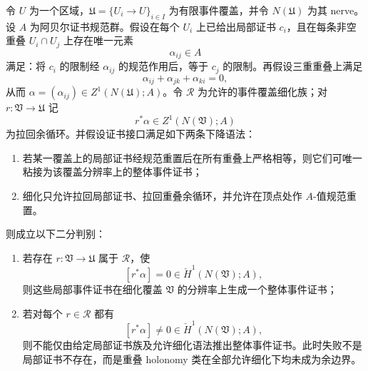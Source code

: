 \begin{theorem}\label{distill:cech_cohomology-local_to_global_certificate_descent-event-cover-certificate-descent}
令 \(U\) 为一个区域，\(\mathfrak U=\{U_i\to U\}_{i\in I}\) 为有限事件覆盖，并令 \(N(\mathfrak U)\) 为其 nerve。设 \(A\) 为阿贝尔证书规范群。假设在每个 \(U_i\) 上已给出局部证书 \(c_i\)，且在每条非空重叠 \(U_i\cap U_j\) 上存在唯一元素
\[
\alpha_{ij}\in A
\]
满足：将 \(c_i\) 的限制经 \(\alpha_{ij}\) 的规范作用后，等于 \(c_j\) 的限制。再假设三重重叠上满足
\[
\alpha_{ij}+\alpha_{jk}+\alpha_{ki}=0,
\]
从而 \(\alpha=(\alpha_{ij})\in Z^1(N(\mathfrak U);A)\)。令 \(\mathscr R\) 为允许的事件覆盖细化族；对 \(r:\mathfrak V\to\mathfrak U\) 记
\[
r^\ast\alpha\in Z^1(N(\mathfrak V);A)
\]
为拉回余循环。并假设证书接口满足如下两条下降语法：
\begin{enumerate}
  \item 若某一覆盖上的局部证书经规范重置后在所有重叠上严格相等，则它们可唯一粘接为该覆盖分辨率上的整体事件证书；
  \item 细化只允许拉回局部证书、拉回重叠余循环，并允许在顶点处作 \(A\)-值规范重置。
\end{enumerate}
则成立以下二分判别：
\begin{enumerate}
  \item 若存在 \(r:\mathfrak V\to\mathfrak U\) 属于 \(\mathscr R\)，使
  \[
  [r^\ast\alpha]=0\in \check H^1(N(\mathfrak V);A),
  \]
  则这些局部事件证书在细化覆盖 \(\mathfrak V\) 的分辨率上生成一个整体事件证书；
  \item 若对每个 \(r\in\mathscr R\) 都有
  \[
  [r^\ast\alpha]\ne0\in \check H^1(N(\mathfrak V);A),
  \]
  则不能仅由给定局部证书族及允许细化语法推出整体事件证书。此时失败不是局部证书不存在，而是重叠 holonomy 类在全部允许细化下均未成为余边界。
\end{enumerate}
\end{theorem}

